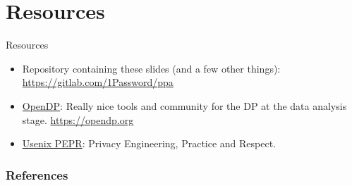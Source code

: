 \documentclass[xcolor={dvipsnames,table,hyperref}]{beamer}
\providecommand*{\reporoot}{https://gitlab.com/1Password/ppa}
\begin{document}
\section{Resources}

\begin{frame}{Resources}
  \begin{itemize}
    \item Repository containing these slides (and a few other things): \url{\reporoot}
    \item \href{https://opendp.org}{OpenDP}: Really nice tools and community for the DP at the data analysis stage. \url{https://opendp.org}
    \item \href{https://www.usenix.org/conferences/byname/1046}{Usenix PEPR}: Privacy Engineering, Practice and Respect.
  \end{itemize}

\end{frame}


\begin{frame}[t,allowframebreaks]
  \frametitle{References}
  \printbibliography[heading=none]
\end{frame}

\end{document}
